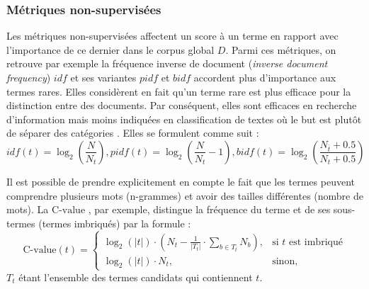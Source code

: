 
\subsubsection{Métriques non-supervisées}
Les métriques non-supervisées affectent un score à un terme en rapport avec l'importance de ce dernier dans le corpus global $D$. Parmi ces métriques, on retrouve par exemple la fréquence inverse de document (\textit{inverse document frequency}) $idf$ \citep{sparck1972idf} et ses variantes $pidf$ \citep{wu1981pidf} et $bidf$ \citep{jones2000bm25idf} accordent plus d'importance aux termes rares. Elles considèrent en fait qu'un terme rare est plus efficace pour la distinction entre des documents. Par conséquent, elles sont efficaces en recherche d'information mais moins indiquées en classification de textes où le but est plutôt de séparer des catégories \citep{wu2017balancingtermweight}. Elles se formulent comme suit :
\[idf(t) = \log_2\left(\frac{N}{N_t}\right), pidf(t) = \log_2\left(\frac{N}{N_t} - 1\right), bidf(t) = \log_2\left(\frac{N_{\overline{t}} + 0.5}{N_t + 0.5}\right)\]

Il est possible de prendre explicitement en compte le fait que les termes peuvent comprendre plusieurs mots (n-grammes) et avoir des tailles différentes (nombre de mots). La $\text{C-value}$ \citep{frantzi2000CValueNCValue}, par exemple, distingue la fréquence du terme et de ses sous-termes (termes imbriqués) par la formule : %
\[\text{C-value}(t) = \begin{cases} \log_2(\vert t \vert) \cdot (N_t - \frac{1}{\vert T_t \vert} \cdot \sum\limits_{b \in T_t} N_b), & \mbox{si } t \mbox{ est imbriqué} \\ \log_2(\vert t \vert) \cdot N_t, & \mbox{sinon,} \end{cases}\]
$T_t$ étant l'ensemble des termes candidats qui contiennent $t$.


